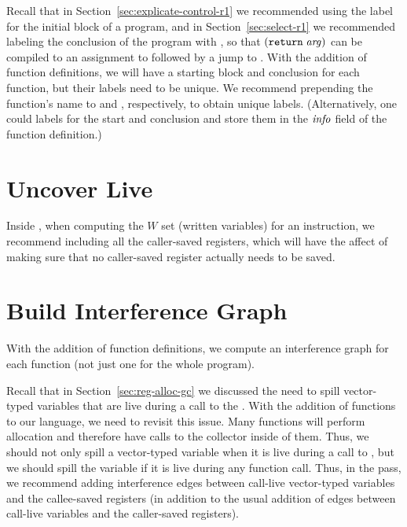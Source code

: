 \documentclass[11pt]{book}
\begin{document}
Recall that in Section~\ref{sec:explicate-control-r1} we recommended
using the label  for the initial block of a program, and
in Section~\ref{sec:select-r1} we recommended labeling the conclusion
of the program with , so that $(\texttt{return}\;\mathit{arg})$
can be compiled to an assignment to  followed by a jump to
. With the addition of function definitions, we will
have a starting block and conclusion for each function, but their
labels need to be unique. We recommend prepending the function's name
to  and , respectively, to obtain unique
labels. (Alternatively, one could  labels for the start
and conclusion and store them in the $\mathit{info}$ field of the
function definition.)


\section{Uncover Live}


Inside , when computing the $W$ set (written
variables) for an  instruction, we recommend
including all the caller-saved registers, which will have the affect
of making sure that no caller-saved register actually needs to be
saved.

\section{Build Interference Graph}

With the addition of function definitions, we compute an interference
graph for each function (not just one for the whole program).

Recall that in Section~\ref{sec:reg-alloc-gc} we discussed the need to
spill vector-typed variables that are live during a call to the
.  With the addition of functions to our language, we
need to revisit this issue. Many functions will perform allocation and
therefore have calls to the collector inside of them. Thus, we should
not only spill a vector-typed variable when it is live during a call
to , but we should spill the variable if it is live
during any function call. Thus, in the  pass,
we recommend adding interference edges between call-live vector-typed
variables and the callee-saved registers (in addition to the usual
addition of edges between call-live variables and the caller-saved
registers).
\end{document}

